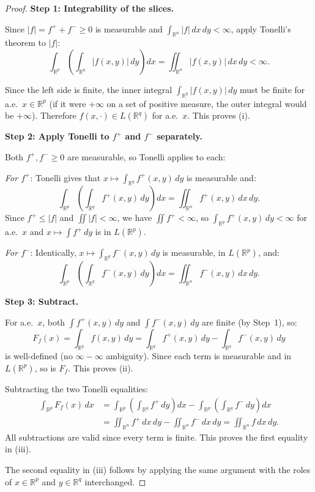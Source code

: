 \documentclass[11pt]{report}
\begin{document}
\begin{proof}
\textbf{Step 1: Integrability of the slices.}

Since $|f| = f^+ + f^- \geq 0$ is measurable and $\int_{\mathbb{R}^n} |f|\,dx\,dy < \infty$, apply Tonelli's theorem to $|f|$:
\[
\int_{\mathbb{R}^p} \left(\int_{\mathbb{R}^q} |f(x, y)|\,dy\right) dx = \iint_{\mathbb{R}^n} |f(x, y)|\,dx\,dy < \infty.
\]

Since the left side is finite, the inner integral $\int_{\mathbb{R}^q} |f(x, y)|\,dy$ must be finite for a.e.\ $x \in \mathbb{R}^p$ (if it were $+\infty$ on a set of positive measure, the outer integral would be $+\infty$). Therefore $f(x, \cdot) \in L(\mathbb{R}^q)$ for a.e.\ $x$. This proves (i).

\textbf{Step 2: Apply Tonelli to $f^+$ and $f^-$ separately.}

Both $f^+, f^- \geq 0$ are measurable, so Tonelli applies to each:

\textit{For $f^+$}: Tonelli gives that $x \mapsto \int_{\mathbb{R}^q} f^+(x,y)\,dy$ is measurable and:
\[
\int_{\mathbb{R}^p} \left(\int_{\mathbb{R}^q} f^+(x, y)\,dy\right) dx = \iint_{\mathbb{R}^n} f^+(x, y)\,dx\,dy.
\]
Since $f^+ \leq |f|$ and $\iint |f| < \infty$, we have $\iint f^+ < \infty$, so $\int_{\mathbb{R}^q} f^+(x,y)\,dy < \infty$ for a.e.\ $x$ and $x \mapsto \int f^+\,dy$ is in $L(\mathbb{R}^p)$.

\textit{For $f^-$}: Identically, $x \mapsto \int_{\mathbb{R}^q} f^-(x,y)\,dy$ is measurable, in $L(\mathbb{R}^p)$, and:
\[
\int_{\mathbb{R}^p} \left(\int_{\mathbb{R}^q} f^-(x, y)\,dy\right) dx = \iint_{\mathbb{R}^n} f^-(x, y)\,dx\,dy.
\]

\textbf{Step 3: Subtract.}

For a.e.\ $x$, both $\int f^+(x,y)\,dy$ and $\int f^-(x,y)\,dy$ are finite (by Step~1), so:
\[
F_f(x) = \int_{\mathbb{R}^q} f(x, y)\,dy = \int_{\mathbb{R}^q} f^+(x, y)\,dy - \int_{\mathbb{R}^q} f^-(x, y)\,dy
\]
is well-defined (no $\infty - \infty$ ambiguity). Since each term is measurable and in $L(\mathbb{R}^p)$, so is $F_f$. This proves (ii).

Subtracting the two Tonelli equalities:
\begin{align*}
\int_{\mathbb{R}^p} F_f(x)\,dx &= \int_{\mathbb{R}^p} \left(\int_{\mathbb{R}^q} f^+\,dy\right) dx - \int_{\mathbb{R}^p} \left(\int_{\mathbb{R}^q} f^-\,dy\right) dx \\
&= \iint_{\mathbb{R}^n} f^+\,dx\,dy - \iint_{\mathbb{R}^n} f^-\,dx\,dy = \iint_{\mathbb{R}^n} f\,dx\,dy.
\end{align*}
All subtractions are valid since every term is finite. This proves the first equality in (iii).

The second equality in (iii) follows by applying the same argument with the roles of $x \in \mathbb{R}^p$ and $y \in \mathbb{R}^q$ interchanged.
\end{proof}
\end{document}
